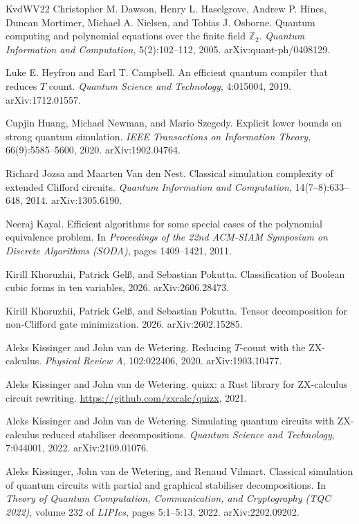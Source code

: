 \documentclass[11pt]{article}
\theoremstyle{definition}
\theoremstyle{remark}
\newcommand{\Z}{\mathbb{Z}}
\begin{document}
\begin{thebibliography}{KvdWV22}
 Christopher M. Dawson, Henry L. Haselgrove, Andrew P. Hines, Duncan Mortimer, Michael A. Nielsen, and Tobias J. Osborne. Quantum computing and polynomial equations over the finite field $\Z_2$. \emph{Quantum Information and Computation}, 5(2):102--112, 2005. arXiv:quant-ph/0408129.

 Luke E. Heyfron and Earl T. Campbell. An efficient quantum compiler that reduces $T$ count. \emph{Quantum Science and Technology}, 4:015004, 2019. arXiv:1712.01557.

 Cupjin Huang, Michael Newman, and Mario Szegedy. Explicit lower bounds on strong quantum simulation. \emph{IEEE Transactions on Information Theory}, 66(9):5585--5600, 2020. arXiv:1902.04764.

 Richard Jozsa and Maarten Van den Nest. Classical simulation complexity of extended Clifford circuits. \emph{Quantum Information and Computation}, 14(7--8):633--648, 2014. arXiv:1305.6190.

 Neeraj Kayal. Efficient algorithms for some special cases of the polynomial equivalence problem. In \emph{Proceedings of the 22nd ACM-SIAM Symposium on Discrete Algorithms (SODA)}, pages 1409--1421, 2011.

 Kirill Khoruzhii, Patrick Gel{\ss}, and Sebastian Pokutta. Classification of Boolean cubic forms in ten variables, 2026. arXiv:2606.28473.

 Kirill Khoruzhii, Patrick Gel{\ss}, and Sebastian Pokutta. Tensor decomposition for non-Clifford gate minimization. 2026. arXiv:2602.15285.

 Aleks Kissinger and John van de Wetering. Reducing $T$-count with the ZX-calculus. \emph{Physical Review A}, 102:022406, 2020. arXiv:1903.10477.

 Aleks Kissinger and John van de Wetering. quizx: a Rust library for ZX-calculus circuit rewriting. \url{https://github.com/zxcalc/quizx}, 2021.

 Aleks Kissinger and John van de Wetering. Simulating quantum circuits with ZX-calculus reduced stabiliser decompositions. \emph{Quantum Science and Technology}, 7:044001, 2022. arXiv:2109.01076.

 Aleks Kissinger, John van de Wetering, and Renaud Vilmart. Classical simulation of quantum circuits with partial and graphical stabiliser decompositions. In \emph{Theory of Quantum Computation, Communication, and Cryptography (TQC 2022)}, volume 232 of \emph{LIPIcs}, pages 5:1--5:13, 2022. arXiv:2202.09202.


\end{thebibliography}
\end{document}
